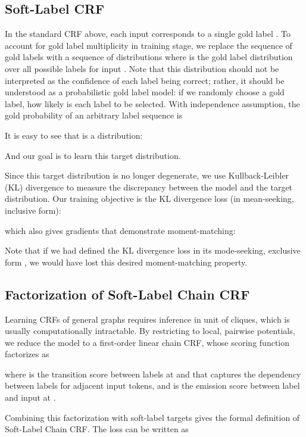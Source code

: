 \documentclass[11pt,a4paper]{article}
\begin{document}
\subsection{Soft-Label CRF}
\label{ssec:sl-crf}

In the standard CRF above, each input  corresponds to a single gold label . To account for gold label multiplicity in training stage, we replace the sequence of gold labels  with a sequence of distributions  where  is the gold label distribution over all  possible labels for input . Note that this distribution should not be interpreted as the confidence of each label being correct; rather, it should be understood as a probabilistic gold label model: if we randomly choose a gold label, how likely is each label to be selected. With independence assumption, the gold probability of an arbitrary label sequence  is

It is easy to see that  is a distribution: 

And our goal is to learn this target distribution. 

Since this target distribution is no longer degenerate, we use Kullback-Leibler (KL) divergence to measure the discrepancy between the model and the target distribution. Our training objective is the KL divergence loss (in mean-seeking, inclusive form): 

which also gives gradients that demonstrate moment-matching: 

Note that if we had defined the KL divergence loss in its mode-seeking, exclusive form , we would have lost this desired moment-matching property. 

\subsection{Factorization of Soft-Label Chain CRF}
\label{ssec:sl-ccrf}

Learning CRFs of general graphs requires inference in unit of cliques, which is usually computationally intractable. By restricting to local, pairwise potentials, we reduce the model to a first-order linear chain CRF, whose scoring function factorizes as

where  is the transition score between labels at  and  that captures the dependency between labels for adjacent input tokens, and  is the emission score between label and input at . 

Combining this factorization with soft-label targets gives the formal definition of Soft-Label Chain CRF. The loss can be written as
\allowdisplaybreaks
\end{document}
